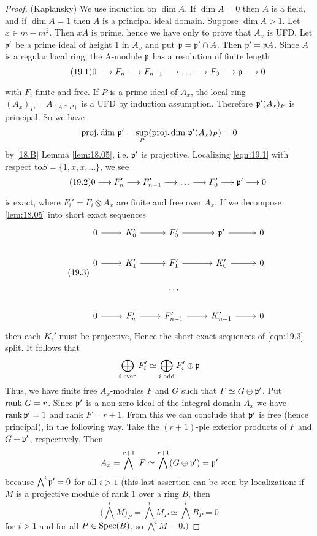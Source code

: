 \documentclass[../main]{subfiles}
\begin{document}
\begin{proof}(Kaplansky) We use induction on $\dim A$. If $\dim A=0$ then $A$ is a field, and if $\dim A=1$ then $A$ is a principal ideal domain. Suppose $\dim A>1$. Let $x \in m-m^2$. Then $xA$ is prime, hence we have only to prove that $A_x$ is UFD. Let $\mathfrak{p}'$ be a prime ideal of height $1$ in $A_x$ and put $\mathfrak{p}=\mathfrak{p}' \cap A$. Then $\mathfrak{p}'=\mathfrak{p} A$. Since $A$ is a regular local ring, the A-module $\mathfrak{p}$ has a resolution of finite length \[\tag{19.1}\label{eqn:19.1} 0\varrightarrow{} F_n\varrightarrow{}F_{n-1}\varrightarrow{} \dots \varrightarrow{}F_0 \varrightarrow{} \ideal{p}\varrightarrow{} 0\] with $F_i$ finite and free. If $P$ is a prime ideal of $A_x$, the local ring $(A_x)_P= A_{(A\cap P)}$ is a UFD by induction assumption. Therefore $\mathfrak{p}'(A_x)_P$ is principal. So we have \[\operatorname{proj. dim} \, \mathfrak{p}' = \sup_P (\operatorname{proj. dim}\, \mathfrak{p}'(A_x)_P)=0 \] by \ref{18.B} Lemma \ref{lem:18.05}, i.e. $\mathfrak{p}'$ is projective. Localizing \ref{eqn:19.1} with respect to\newline $S=\{1, x, x,\dots \}$, we see \[\tag{19.2}\label{eqn:19.2} 0\varrightarrow{} F_n' \varrightarrow{} F_{n-1}' \varrightarrow{} \dots \varrightarrow{}F_0' \varrightarrow{}\ideal{p}' \varrightarrow{} 0\] is exact, where $F_i'=F_i \otimes A_x$ are finite and free over $A_x$. If we decompose \ref{lem:18.05} into short exact sequences
\[\tag{19.3}\label{eqn:19.3} \begin{tikzcd}
0 \arrow[r]& K_0' \arrow[r]& F_0' \arrow[r] &\ideal{p}' \arrow[r]& 0\\
0 \arrow[r]& K_1' \arrow[r]& F_1' \arrow[r] &K_0' \arrow[r]& 0\\
 && \dots &&\\
0 \arrow[r]& F_n' \arrow[r]& F_{n-1}' \arrow[r] & K_{n-1}' \arrow[r]& 0
\end{tikzcd}
\]
then each $K_i'$ must be projective, Hence the short exact sequences of \ref{eqn:19.3} split. It follows that
\[\bigoplus_{i\text{ even}} F_i' \simeq \bigoplus_{i\text{ odd}} F_i'\oplus \mathfrak{p}\]
Thus, we have finite free $A_x$-modules $F$ and $G$ such that $F \simeq G \oplus \mathfrak{p}'$. Put $\operatorname{rank}\, G = r$. Since $\mathfrak{p}' $ is a non-zero ideal of the integral domain $A_x$ we have $\operatorname{rank} \mathfrak{p}'=1$ and rank $F=r+1$. From this we can conclude that $\mathfrak{p}'$ is free (hence principal), in the following way. Take the $(r+1)$-ple exterior products of $F$ and $G+\mathfrak{p}'$, respectively. Then
\[
A_x=\bigwedge^{r+1} ~F \simeq \bigwedge^{r+1}(G \oplus \mathfrak{p}')=\mathfrak{p}'
\]
because $\bigwedge^i \mathfrak{p}'=0$ for all $i>1$ (this last assertion can be seen by localization: if $M$ is a projective module of rank $1$ over a ring $B$, then \[\Big(\bigwedge^iM\Big)_P=\bigwedge^i M_P \simeq \bigwedge^i B_P=0\] for $i>1$ and for all $P \in \operatorname{Spec}(B)$, so $\bigwedge^i M=0 .)$
\end{proof}
\end{document}
